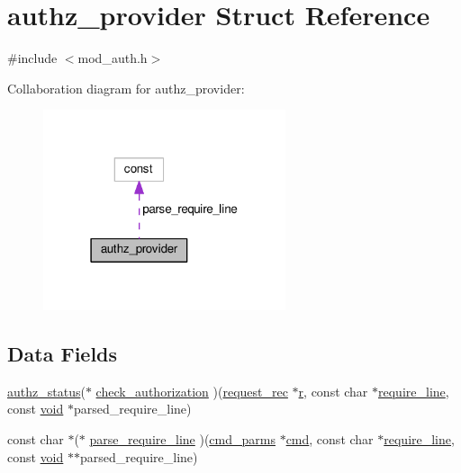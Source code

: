 \hypertarget{structauthz__provider}{}\section{authz\+\_\+provider Struct Reference}
\label{structauthz__provider}


{\ttfamily \#include $<$mod\+\_\+auth.\+h$>$}



Collaboration diagram for authz\+\_\+provider\+:
\nopagebreak
\begin{figure}[H]
\begin{center}
\leavevmode
\includegraphics[width=202pt]{structauthz__provider__coll__graph}
\end{center}
\end{figure}
\subsection*{Data Fields}
\begin{DoxyCompactItemize}
\item 
\hyperlink{mod__auth_8h_a60cb8601ab21d62c160006c0cbbd24ce}{authz\+\_\+status}($\ast$ \hyperlink{structauthz__provider_a560fee932f4a5d45a5ef2d6f0388db06}{check\+\_\+authorization} )(\hyperlink{structrequest__rec}{request\+\_\+rec} $\ast$\hyperlink{pcregrep_8txt_a2e9e9438b26c0bb4425367a7e4f75eb3}{r}, const char $\ast$\hyperlink{structrequire__line}{require\+\_\+line}, const \hyperlink{group__MOD__ISAPI_gacd6cdbf73df3d9eed42fa493d9b621a6}{void} $\ast$parsed\+\_\+require\+\_\+line)
\item 
const char $\ast$($\ast$ \hyperlink{structauthz__provider_a3a45dd7e666b1f43b2a1532b84e0591a}{parse\+\_\+require\+\_\+line} )(\hyperlink{group__APACHE__CORE__CONFIG_ga1791fbd28d06a9847bad001541c5241e}{cmd\+\_\+parms} $\ast$\hyperlink{group__apr__thread__proc_ga7b715f5a87a71c6766684c1798251237}{cmd}, const char $\ast$\hyperlink{structrequire__line}{require\+\_\+line}, const \hyperlink{group__MOD__ISAPI_gacd6cdbf73df3d9eed42fa493d9b621a6}{void} $\ast$$\ast$parsed\+\_\+require\+\_\+line)
\end{DoxyCompactItemize}


